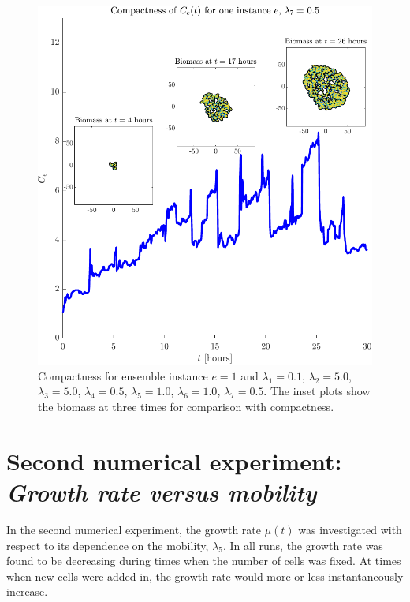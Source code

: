 \begin{figure}[!htb] %
    \centering
    \includegraphics[width= \textwidth]{
        chapter3/figures/Inset_L1_0o10_L2_5o00_L3_5o00_L4_0o50_L5_1o00_L6_1o00_L7_0o50.pdf}
    \caption{Compactness for ensemble instance $e = 1$ and 
             $\lambda_1 = 0.1$,  
             $\lambda_2 = 5.0$, 
             $\lambda_3 = 5.0$, 
             $\lambda_4 = 0.5$, 
             $\lambda_5 = 1.0$, 
             $\lambda_6 = 1.0$, 
             $\lambda_7 = 0.5$. The inset plots show the biomass at three times for comparison 
             with compactness.}
    \label{fig:compactnessSingleInstance0.5}
\end{figure}


\section{Second numerical experiment: \\ \textit{Growth rate versus mobility}}\label{sec:numExp2}

In the second numerical experiment, the growth rate $\mu(t)$ was investigated with respect 
to its dependence on the mobility, $\lambda_5$. In all runs, the growth rate was found to be decreasing 
during times when the number of cells was fixed. At times when new cells were added in,
the growth rate would more or less instantaneously increase. 
\\

